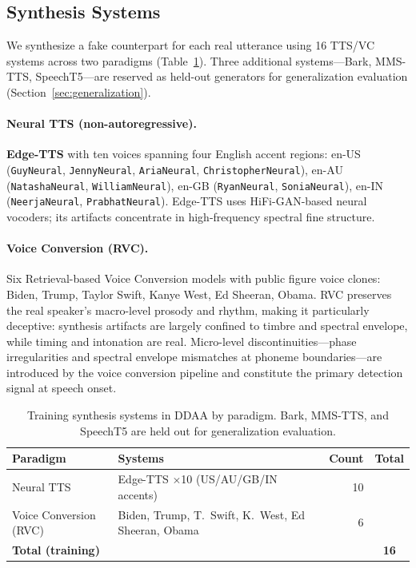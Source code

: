 \documentclass{article}
\newcommand{\ddaa}{\textsc{DDAA}}
\begin{document}
\subsection{Synthesis Systems}
\label{sec:synthesis}

We synthesize a fake counterpart for each real utterance using 16 TTS/VC
systems across two paradigms (Table~\ref{tab:systems}).  Three additional
systems---Bark, MMS-TTS, SpeechT5---are reserved as held-out generators
for generalization evaluation (Section~\ref{sec:generalization}).

\paragraph{Neural TTS (non-autoregressive).}
\textbf{Edge-TTS} \citep{microsoftedge} with ten voices spanning four
English accent regions:
en-US (\texttt{GuyNeural}, \texttt{JennyNeural}, \texttt{AriaNeural},
\texttt{ChristopherNeural}),
en-AU (\texttt{NatashaNeural}, \texttt{WilliamNeural}),
en-GB (\texttt{RyanNeural}, \texttt{SoniaNeural}),
en-IN (\texttt{NeerjaNeural}, \texttt{PrabhatNeural}).
Edge-TTS uses HiFi-GAN-based neural vocoders; its artifacts concentrate in
high-frequency spectral fine structure.

\paragraph{Voice Conversion (RVC).}
Six Retrieval-based Voice Conversion \citep{rvc2023} models with public
figure voice clones: Biden, Trump, Taylor Swift, Kanye West, Ed Sheeran,
Obama.
RVC preserves the real speaker's macro-level prosody and rhythm, making it
particularly deceptive: synthesis artifacts are largely confined to timbre
and spectral envelope, while timing and intonation are real.  Micro-level
discontinuities---phase irregularities and spectral envelope mismatches at
phoneme boundaries---are introduced by the voice conversion pipeline and
constitute the primary detection signal at speech onset.

\begin{table}[h]
  \caption{Training synthesis systems in \ddaa{} by paradigm.
  Bark, MMS-TTS, and SpeechT5 are held out for generalization evaluation.}
  \label{tab:systems}
  \centering
  \small
  \begin{tabular}{llrc}
    \toprule
    Paradigm & Systems & Count & Total \\
    \midrule
    Neural TTS & Edge-TTS $\times$10 (US/AU/GB/IN accents) & 10 & \\
    Voice Conversion (RVC) & Biden, Trump, T.\ Swift, K.\ West, Ed Sheeran, Obama & 6 & \\
    \midrule
    \textbf{Total (training)} & & & \textbf{16} \\
    \bottomrule
  \end{tabular}
\end{table}
\end{document}
